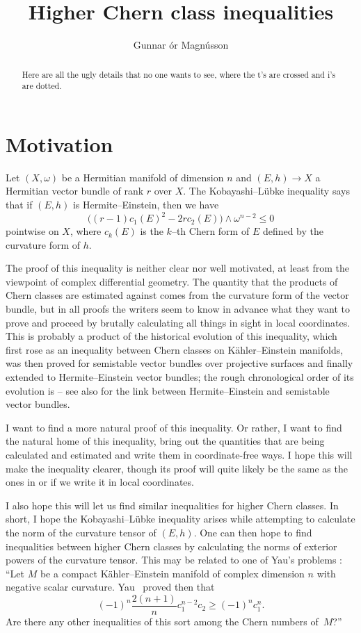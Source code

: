 \documentclass[11pt,a4paper]{amsart}
\title{Higher Chern class inequalities}
\author{Gunnar \TH\'{o}r Magn\'{u}sson}
\theoremstyle{definition}
\numberwithin{equation}{section}
\begin{document}
\begin{abstract}
Here are all the ugly details that no one wants to see, where the t's are
crossed and i's are dotted.
\end{abstract}

\maketitle 



\section*{Motivation}

Let $(X,\omega)$ be a Hermitian manifold of dimension $n$ and $(E,h) \to X$
a Hermitian vector bundle of rank $r$ over $X$. The Kobayashi--L\"{u}bke
inequality says that if $(E,h)$ is Hermite--Einstein, then we have
$$
\bigl((r-1)c_1(E)^2 - 2rc_2(E)\bigr) \wedge \omega^{n-2} \leq 0
$$
pointwise on $X$, where $c_k(E)$ is the $k$--th Chern form of $E$ defined by the curvature form of $h$.

The proof of this inequality is neither clear nor well motivated, at
least from the viewpoint of complex differential geometry. The quantity
that the products of Chern classes are estimated against comes from the
curvature form of the vector bundle, but in all proofs the writers seem
to know in advance what they want to prove and proceed by brutally
calculating all things in sight in local coordinates. This is probably a
product of the historical evolution of this inequality, which first rose as
an inequality between Chern classes on K\"ahler--Einstein manifolds, was
then proved for semistable vector bundles over projective surfaces and
finally extended to Hermite--Einstein vector bundles; the rough
chronological order of its evolution is
\cite{Chen-Ogiue,Bogomolov,Gieseker,Lubke} -- see also
\cite{Kobayashi,LubkeStab,Siu} for the link between Hermite--Einstein
and semistable vector bundles.

I want to find a more natural proof of this inequality. Or rather, I want
to find the natural home of this inequality, bring out the quantities
that are being calculated and estimated and write them in coordinate-free
ways. I hope this will make the inequality clearer, though its proof will
quite likely be the same as the ones in \cite{Chen-Ogiue} or \cite{Lubke}
if we write it in local coordinates.

I also hope this will let us find similar inequalities for higher Chern
classes. In short, I hope the Kobayashi--L\"{u}bke inequality arises while
attempting to calculate the norm of the curvature tensor of $(E,h)$. One can
then hope to find inequalities between higher Chern classes by calculating
the norms of exterior powers of the curvature tensor. This may be related
to one of Yau's problems \cite[Problem~45]{Yau}: ``Let $M$ be a compact
K\"{a}hler--Einstein manifold of complex dimension $n$ with negative scalar
curvature. Yau~\cite{Yau2} proved then that
$$
(-1)^n \frac{2(n+1)}{n} c_1^{n-2} c_2 \geq (-1)^n c_1^n.
$$
Are there any other inequalities of this sort among the Chern numbers
of~$M$?''%
\end{document}
